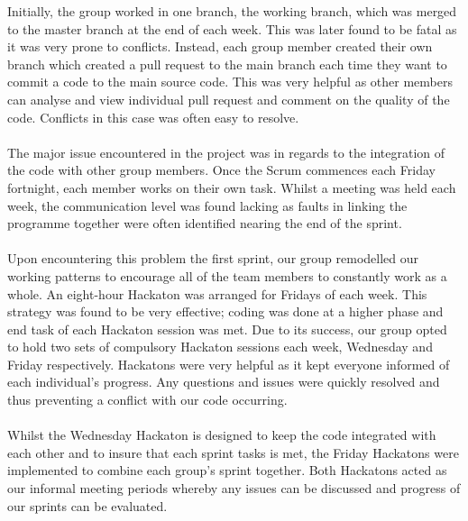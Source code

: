 \documentclass{article}
\begin{document}
		Initially, the group worked in one branch, the working branch, which was merged to the master branch at the end of each week. This was later found to be fatal as it was very prone to conflicts.  Instead, each group member created their own branch which created a pull request to the main branch each time they want to commit a code to the main source code. This was very helpful as other members can analyse and view individual pull request and comment on the quality of the code.  Conflicts in this case was often easy to resolve.\\ 
		\\The major issue encountered in the project was in regards to the integration of the code with other group members. Once the Scrum commences each Friday fortnight, each member works on their own task.  Whilst a meeting was held each week, the communication level was found lacking as faults in linking the programme together were often identified nearing the end of the sprint.\\
\\Upon encountering this problem the first sprint, our group remodelled our working patterns to encourage all of the team members to constantly work as a whole.  An eight-hour Hackaton was arranged for Fridays of each week.  This strategy was found to be very effective; coding was done at a higher phase and end task of each Hackaton session was met.  Due to its success, our group opted to hold two sets of compulsory Hackaton sessions each week, Wednesday and Friday respectively.  Hackatons were very helpful as it kept everyone informed of each individual's progress. Any questions and issues were quickly resolved and thus preventing a conflict with our code occurring.\\
\\Whilst the Wednesday Hackaton is designed to keep the code integrated with each other and to insure that each sprint tasks is met, the Friday Hackatons were implemented to combine each group's sprint together. Both Hackatons acted as our informal meeting periods whereby any issues can be discussed and progress of our sprints can be evaluated.
\end{document}
